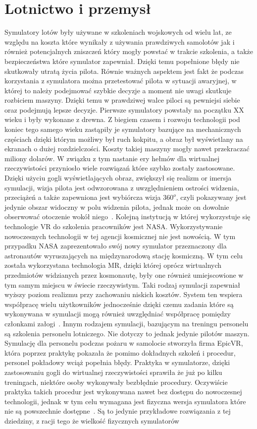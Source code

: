 \section{Lotnictwo i przemysł}
\label{sec:lotnictwo}
 Symulatory lotów były używane w szkoleniach wojskowych od wielu lat, ze względu na koszta które wynikały z używania prawdziwych samolotów jak i również potencjalnych zniszczeń który mogły powstać w trakcie szkolenia, a także bezpieczeństwa które symulator zapewniał. Dzięki temu popełnione błędy nie skutkowały utratą życia pilota. Równie ważnych aspektem jest fakt że podczas korzystania z symulatora można przetestować pilota w sytuacji awaryjnej, w której to należy podejmować szybkie decyzje a moment nie uwagi skutkuje rozbiciem maszyny. Dzięki temu w prawdziwej walce piloci są pewniejsi siebie oraz podejmują lepsze decyzje. Pierwsze symulatory powstały na początku XX wieku i były wykonane z drewna. Z biegiem czasem i rozwoju technologii pod koniec tego samego wieku zastąpiły je symulatory bazujące na mechanicznych częściach dzięki którym możliwy był ruch kokpitu, a obraz był wyświetlany na ekranach o dużej rozdzielczości. Koszty takiej maszyny mogły nawet przekraczać miliony dolarów. W związku z tym nastanie ery hełmów dla wirtualnej rzeczywistości przyniosło wiele rozwiązań które szybko zostały zastosowane. Dzięki użyciu gogli wyświetlających obraz, zwiększył się realizm or imersja symulacji, wizja pilota jest odwzorowana z uwzględnieniem ostrości widzenia, przeciążeń a także zapewniona jest wybiórcza wizja $360^o$, czyli pokazywany jest jedynie obszar widoczny w polu widzenia pilota, jednak może on dowolnie obserwować otoczenie wokół niego~\cite{del}. Kolejną instytucją w której wykorzystuje się technologie VR do szkolenia pracowników jest NASA. Wykorzystywanie nowoczesnych technologii w tej agencji kosmicznej nie jest nowością. W tym przypadku NASA zaprezentowało swój nowy symulator przeznaczony dla astronautów wyruszających na międzynarodową stację kosmiczną. W tym celu została wykorzystana technologia MR, dzięki której oprócz wirtualnych przedmiotów widzianych przez kosmonautę, były one również umiejscowione w tym samym miejscu w świecie rzeczywistym. Taki rodzaj symulacji zapewniał wyższy poziom realizmu przy zachowaniu niskich kosztów. System ten wspiera współpracę wielu użytkowników jednocześnie dzięki czemu zadania które są wykonywana w symulacji mogą również uwzględniać współpracę pomiędzy członkami załogi~\cite{nasa1}. Innym rodzajem symulacji, bazującym na treningu personelu są szkolenia personelu lotniczego. Nie dotyczy to jednak jedynie pilotów maszyn. Symulację dla personelu podczas pożaru w samolocie stworzyła firma EpicVR, która poprzez praktykę pokazała że pomimo dokładnych szkoleń i procedur, personel pokładowy wciąż popełnia błędy. Praktyka w symulatorze, dzięki zastosowaniu gogli do wirtualnej rzeczywistości sprawiła że już po kilku treningach, niektóre osoby wykonywały bezbłędnie procedury. Oczywiście praktyka takich procedur jest wykonywana nawet bez dostępu do nowoczesnej technologii, jednak w tym celu wymagana jest fizyczna wersja symulatora które nie są powszechnie dostępne~\cite{epicvr}. Są to jedynie przykładowe rozwiązania z tej dziedziny, z racji tego że wielkość fizycznych symulatorów 
